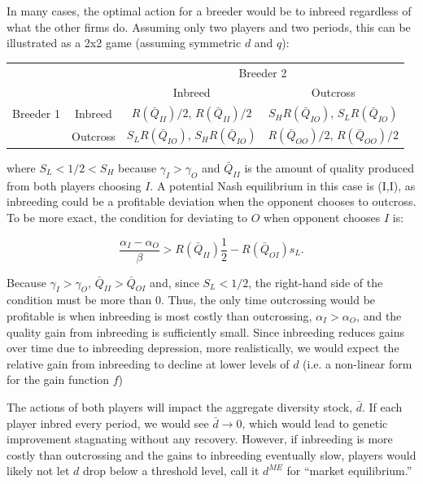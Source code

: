 \documentclass[12pt,letterpaper]{article}
\begin{document}
In many cases, the optimal action for a breeder would be to inbreed regardless of what the other firms do.
Assuming only two players and two periods, this can be illustrated as a 2x2 game (assuming symmetric $d$ and $q$):
\begin{center}
\begin{tabular}{cc|cc}
& & \multicolumn{2}{c}{Breeder 2}\\
& & Inbreed & Outcross \\ \hline
Breeder 1 & Inbreed & $R(\bar{Q}_{II})/2$, $R(\bar{Q}_{II})/2$ & $S_H R(\bar{Q}_{IO})$, $S_L R(\bar{Q}_{IO})$ \\
          & Outcross & $S_L R(\bar{Q}_{IO})$, $S_H R(\bar{Q}_{IO})$ & $R(\bar{Q}_{OO})/2$, $R(\bar{Q}_{OO})/2$ \\
\end{tabular}
\end{center} 
\vspace{.5cm}

where $S_L<1/2<S_H$ because $\gamma_I>\gamma_O$ and $\bar{Q}_{II}$ is the amount of quality produced from both players choosing $I$. 
A potential Nash equilibrium in this case is (I,I), as inbreeding could be a profitable deviation when the opponent chooses to outcross.
To be more exact, the condition for deviating to $O$ when opponent chooses $I$ is:

$$\frac{\alpha_I - \alpha_O}{\beta} > R(\bar{Q}_{II})\frac{1}{2} - R(\bar{Q}_{OI})s_L.$$
 
Because $\gamma_I>\gamma_O$, $\bar{Q}_{II}>\bar{Q}_{OI}$ and, since $S_L<1/2$, the right-hand side of the condition must be more than 0.
Thus, the only time outcrossing would be profitable is when inbreeding is most costly than outcrossing, $\alpha_I>\alpha_O$, and the quality gain from inbreeding is sufficiently small.
Since inbreeding reduces gains over time due to inbreeding depression, more realistically, we would expect the relative gain from inbreeding to decline at lower levels of $d$ (i.e. a non-linear form for the gain function $f$) 

The actions of both players will impact the aggregate diversity stock, $\bar{d}$.
If each player inbred every period, we would see $\bar{d} \rightarrow 0$, which would lead to genetic improvement stagnating without any recovery.
However, if inbreeding is more costly than outcrossing and the gains to inbreeding eventually slow, players would likely not let $d$ drop below a threshold level, call it $d^{ME}$ for ``market equilibrium.''
\end{document}
